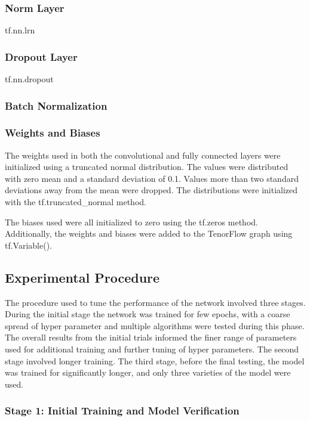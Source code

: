 \documentclass[]{article}
\begin{document}
\subsubsection{Norm Layer}

tf.nn.lrn

\subsubsection{Dropout Layer}

tf.nn.dropout

\subsubsection{Batch Normalization}

\subsubsection{Weights and Biases}

The weights used in both the convolutional and fully connected layers were initialized using a truncated normal distribution. The values were distributed with zero mean and a standard deviation of 0.1. Values more than two standard deviations away from the mean were dropped. The distributions were initialized with the tf.truncated\_normal method. 

The biases used were all initialized to zero using the tf.zeros method. Additionally, the weights and biases were added to the TenorFlow graph using  tf.Variable().

\subsection{Experimental Procedure}

The procedure used to tune the performance of the network involved three stages. During the initial stage the network was trained for few epochs, with a coarse spread of hyper parameter and multiple algorithms were tested during this phase. The overall results from the initial trials informed the finer range of parameters used for additional training and further tuning of hyper parameters. The second stage involved longer training. The third stage, before the final testing, the model was trained for significantly longer, and only three varieties of the model were used. 

\subsubsection{Stage 1: Initial Training and Model Verification}
\end{document}
